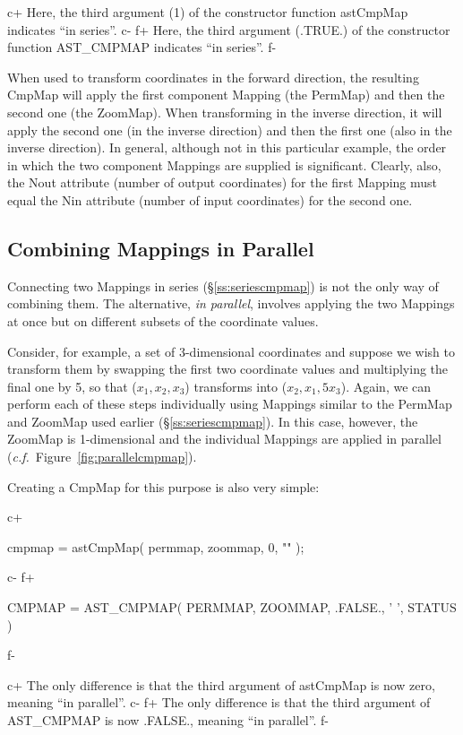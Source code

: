 \documentclass[twoside,11pt]{starlink}
\providecommand{\secref}[1]{\S\ref{#1}}
\begin{document}
c+
Here, the third argument (1) of the constructor function astCmpMap
indicates ``in series''.
c-
f+
Here, the third argument (.TRUE.) of the constructor function
AST\_CMPMAP indicates ``in series''.
f-

When used to transform coordinates in the forward direction, the
resulting CmpMap will apply the first component Mapping (the PermMap)
and then the second one (the ZoomMap). When transforming in the
inverse direction, it will apply the second one (in the inverse
direction) and then the first one (also in the inverse direction).  In
general, although not in this particular example, the order in which
the two component Mappings are supplied is significant. Clearly, also,
the Nout attribute (number of output coordinates) for the first
Mapping must equal the Nin attribute (number of input coordinates) for
the second one.

\subsection{Combining Mappings in Parallel}

Connecting two Mappings in series (\secref{ss:seriescmpmap}) is not the
only way of combining them. The alternative, \emph{in parallel},
involves applying the two Mappings at once but on different subsets of
the coordinate values.

Consider, for example, a set of 3-dimensional coordinates and suppose
we wish to transform them by swapping the first two coordinate values
and multiplying the final one by 5, so that ($x_1,x_2,x_3$) transforms
into ($x_2,x_1,5x_3$). Again, we can perform each of these steps
individually using Mappings similar to the PermMap and ZoomMap used
earlier (\secref{ss:seriescmpmap}). In this case, however, the ZoomMap is
1-dimensional and the individual Mappings are applied in parallel
(\emph{c.f.}\ Figure~\ref{fig:parallelcmpmap}).

Creating a CmpMap for this purpose is also very simple:

c+
\small
\begin{terminalv}
cmpmap = astCmpMap( permmap, zoommap, 0, "" );
\end{terminalv}
\normalsize
c-
f+
\small
\begin{terminalv}
      CMPMAP = AST_CMPMAP( PERMMAP, ZOOMMAP, .FALSE., ' ', STATUS )
\end{terminalv}
\normalsize
f-

c+
The only difference is that the third argument of astCmpMap is now
zero, meaning ``in parallel''.
c-
f+
The only difference is that the third argument of AST\_CMPMAP is now
.FALSE., meaning ``in parallel''.
f-
\end{document}
